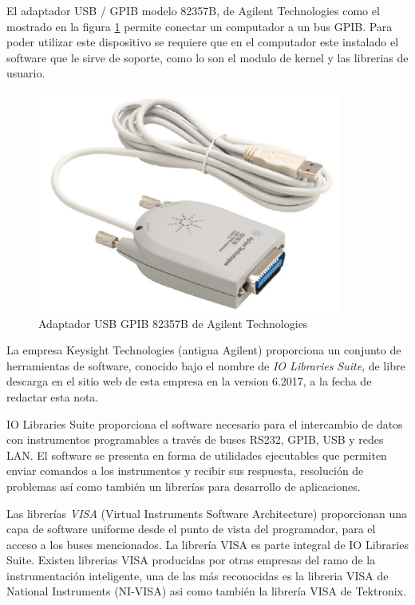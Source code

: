 \documentclass[paper=letter,oneside,fontsize=11pt, parskip=full]{scrartcl}
\begin{document}
		El adaptador USB / GPIB modelo 82357B, de Agilent Technologies como el mostrado en la figura \ref{Fig:AdaptadorGpibUsb} permite conectar un computador a un bus GPIB. Para poder utilizar este dispositivo se requiere que en el computador este instalado el software que le sirve de soporte, como lo son el modulo de kernel y las librerias de usuario.	
		
		\begin{figure}[!h]
			\begin{center}
				\includegraphics[width=10cm]{Imagenes/AdaptadorGpibUsb.pdf}
				\caption{Adaptador USB GPIB 82357B de Agilent Technologies}
				\label{Fig:AdaptadorGpibUsb}
			\end{center}
		\end{figure}	
		
		La empresa Keysight Technologies (antigua Agilent) proporciona un conjunto de herramientas de software, conocido bajo el nombre de \emph{IO Libraries Suite}, de libre descarga en el sitio web de esta empresa en la version 6.2017, a la fecha de redactar esta nota.
		
		IO Libraries Suite proporciona el software necesario para el intercambio de datos con instrumentos programables a través de buses RS232, GPIB, USB y redes LAN. El software se presenta en forma de utilidades ejecutables que permiten enviar comandos a los instrumentos y recibir sus respuesta, resolución de problemas así como también un librerías para desarrollo de aplicaciones.
		
		Las librerías \emph{VISA} (Virtual Instruments Software Architecture) proporcionan una capa de software uniforme desde el punto de vista del programador, para el acceso a los buses mencionados. La librería VISA es parte integral de IO Libraries Suite. Existen librerias VISA producidas por otras empresas del ramo de la instrumentación inteligente, una de las más reconocidas es la libreria VISA de National Instruments (NI-VISA) asi como también la librería VISA de Tektronix.
		
\end{document}
